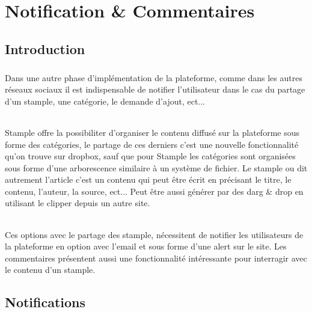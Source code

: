 \chapter{Notification \& Commentaires}
\section{Introduction}
\paragraph{}
Dans une autre phase d'implémentation de la plateforme, comme dans les autres réseaux sociaux il est indispensable de notifier l'utilisateur dans le cas du partage d'un stample, une catégorie, le demande d'ajout, ect...
\subparagraph{}
Stample offre la possibiliter d'organiser le contenu diffusé sur la plateforme sous forme des catégories, le partage de ces derniers c'est une nouvelle fonctionnalité qu'on trouve sur dropbox, sauf que pour Stample les catégories sont organisées sous forme d'une arborescence similaire à un système de fichier.
\newline
Le stample ou dit autrement l'article c'est un contenu qui peut être écrit en précisant le titre, le contenu, l'auteur, la source, ect...
Peut être aussi générer par des darg \& drop en utilisant le clipper depuis un autre site.
\subparagraph{}
Ces options avec le partage des stample, nécessitent de notifier les utilisateurs de la plateforme en option avec l'email et sous forme d'une alert sur le site.
\newline
Les commentaires présentent aussi une fonctionnalité intéressante pour interragir avec le contenu d'un stample.
\section{Notifications}

